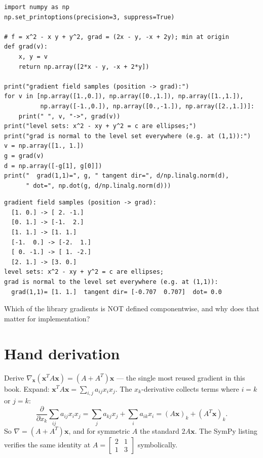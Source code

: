 \begin{lstlisting}[caption={\ttfamily code/ch11\_grad\_field.py --- the
data behind Figure~\ref{fig:gradcontour}: sampled gradients and the
gradient$\perp$tangent check.}]
import numpy as np
np.set_printoptions(precision=3, suppress=True)

# f = x^2 - x y + y^2, grad = (2x - y, -x + 2y); min at origin
def grad(v):
    x, y = v
    return np.array([2*x - y, -x + 2*y])

print("gradient field samples (position -> grad):")
for v in [np.array([1.,0.]), np.array([0.,1.]), np.array([1.,1.]),
          np.array([-1.,0.]), np.array([0.,-1.]), np.array([2.,1.])]:
    print(" ", v, "->", grad(v))
print("level sets: x^2 - xy + y^2 = c are ellipses;")
print("grad is normal to the level set everywhere (e.g. at (1,1)):")
v = np.array([1., 1.])
g = grad(v)
d = np.array([-g[1], g[0]])
print("  grad(1,1)=", g, " tangent dir=", d/np.linalg.norm(d),
      " dot=", np.dot(g, d/np.linalg.norm(d)))
\end{lstlisting}

\begin{lstlisting}[caption={Output of the field sampler. Notice
$\nabla f(1,1)\cdot\mathbf t=0$ exactly --- gradient perpendicular to
the level curve's tangent, numerically confirmed.}]
gradient field samples (position -> grad):
  [1. 0.] -> [ 2. -1.]
  [0. 1.] -> [-1.  2.]
  [1. 1.] -> [1. 1.]
  [-1.  0.] -> [-2.  1.]
  [ 0. -1.] -> [ 1. -2.]
  [2. 1.] -> [3. 0.]
level sets: x^2 - xy + y^2 = c are ellipses;
grad is normal to the level set everywhere (e.g. at (1,1)):
  grad(1,1)= [1. 1.]  tangent dir= [-0.707  0.707]  dot= 0.0
\end{lstlisting}

\begin{exercise}[easy]
Which of the library gradients is NOT defined componentwise, and why does
that matter for implementation?
\end{exercise}

\section{Hand derivation}\label{sec:handderiv11}

Derive $\nabla_{\mathbf x}(\mathbf x^{T}A\mathbf x)=(A+A^{T})\mathbf x$
--- the single most reused gradient in this book. Expand:
$\mathbf x^{T}A\mathbf x=\sum_{i,j}a_{ij}x_ix_j$. The $x_k$-derivative
collects terms where $i=k$ or $j=k$:
\[
\frac{\partial}{\partial x_k}\sum_{ij}a_{ij}x_ix_j
=\sum_j a_{kj}x_j+\sum_i a_{ik}x_i
=(A\mathbf x)_k+(A^{T}\mathbf x)_k.
\]
So $\nabla=(A+A^{T})\mathbf x$, and for symmetric $A$ the standard
$2A\mathbf x$. The SymPy listing verifies the same identity at
$A=\begin{bmatrix}2&1\\1&3\end{bmatrix}$ symbolically.


